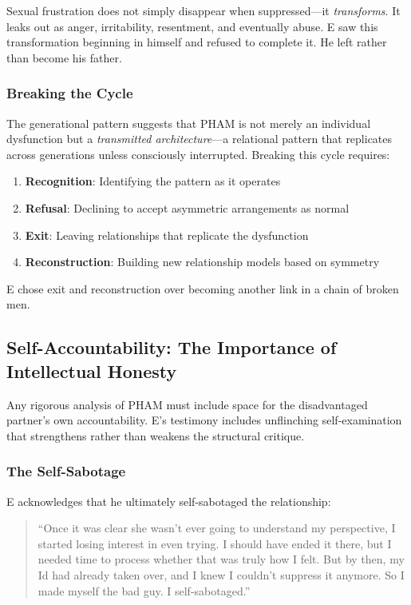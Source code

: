 \documentclass[12pt, letterpaper]{article}
\begin{document}
Sexual frustration does not simply disappear when suppressed---it \textit{transforms}. It leaks out as anger, irritability, resentment, and eventually abuse. E saw this transformation beginning in himself and refused to complete it. He left rather than become his father.

\subsubsection{Breaking the Cycle}

The generational pattern suggests that PHAM is not merely an individual dysfunction but a \textit{transmitted architecture}---a relational pattern that replicates across generations unless consciously interrupted. Breaking this cycle requires:

\begin{enumerate}
    \item \textbf{Recognition}: Identifying the pattern as it operates
    \item \textbf{Refusal}: Declining to accept asymmetric arrangements as normal
    \item \textbf{Exit}: Leaving relationships that replicate the dysfunction
    \item \textbf{Reconstruction}: Building new relationship models based on symmetry
\end{enumerate}

E chose exit and reconstruction over becoming another link in a chain of broken men.

\subsection{Self-Accountability: The Importance of Intellectual Honesty}

Any rigorous analysis of PHAM must include space for the disadvantaged partner's own accountability. E's testimony includes unflinching self-examination that strengthens rather than weakens the structural critique.

\subsubsection{The Self-Sabotage}

E acknowledges that he ultimately self-sabotaged the relationship:

\begin{quote}
``Once it was clear she wasn't ever going to understand my perspective, I started losing interest in even trying. I should have ended it there, but I needed time to process whether that was truly how I felt. But by then, my Id had already taken over, and I knew I couldn't suppress it anymore. So I made myself the bad guy. I self-sabotaged.''
\end{quote}
\end{document}
